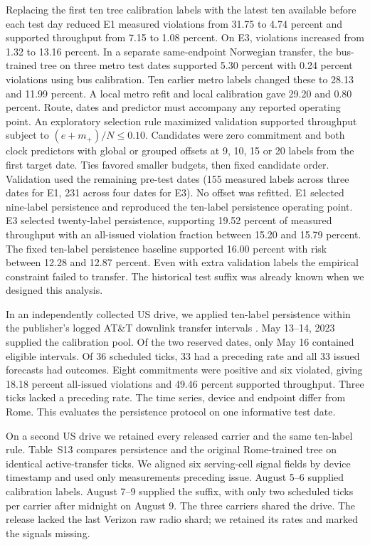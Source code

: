 \documentclass[journal,onecolumn,10pt]{IEEEtran}
\begin{document}
Replacing the first ten tree calibration labels with the latest ten available before each test day reduced E1 measured violations from 31.75 to 4.74 percent and supported throughput from 7.15 to 1.08 percent. On E3, violations increased from 1.32 to 13.16 percent. In a separate same-endpoint Norwegian transfer, the bus-trained tree on three metro test dates supported 5.30 percent with 0.24 percent violations using bus calibration. Ten earlier metro labels changed these to 28.13 and 11.99 percent. A local metro refit and local calibration gave 29.20 and 0.80 percent. Route, dates and predictor must accompany any reported operating point.
An exploratory selection rule maximized validation supported throughput subject to $(e+m_+)/N\leq0.10$. Candidates were zero commitment and both clock predictors with global or grouped offsets at 9, 10, 15 or 20 labels from the first target date. Ties favored smaller budgets, then fixed candidate order. Validation used the remaining pre-test dates (155 measured labels across three dates for E1, 231 across four dates for E3). No offset was refitted. E1 selected nine-label persistence and reproduced the ten-label persistence operating point. E3 selected twenty-label persistence, supporting 19.52 percent of measured throughput with an all-issued violation fraction between 15.20 and 15.79 percent. The fixed ten-label persistence baseline supported 16.00 percent with risk between 12.28 and 12.87 percent. Even with extra validation labels the empirical constraint failed to transfer. The historical test suffix was already known when we designed this analysis.

In an independently collected US drive, we applied ten-label persistence within the publisher's logged AT\&T downlink transfer intervals \cite{nuwinsarchive}. May 13--14, 2023 supplied the calibration pool. Of the two reserved dates, only May 16 contained eligible intervals. Of 36 scheduled ticks, 33 had a preceding rate and all 33 issued forecasts had outcomes. Eight commitments were positive and six violated, giving 18.18 percent all-issued violations and 49.46 percent supported throughput. Three ticks lacked a preceding rate. The time series, device and endpoint differ from Rome. This evaluates the persistence protocol on one informative test date.


On a second US drive we retained every released carrier and the same ten-label rule. Table~S13 compares persistence and the original Rome-trained tree on identical active-transfer ticks. We aligned six serving-cell signal fields by device timestamp and used only measurements preceding issue. August 5--6 supplied calibration labels. August 7--9 supplied the suffix, with only two scheduled ticks per carrier after midnight on August 9. The three carriers shared the drive. The release lacked the last Verizon raw radio shard; we retained its rates and marked the signals missing.
\end{document}
